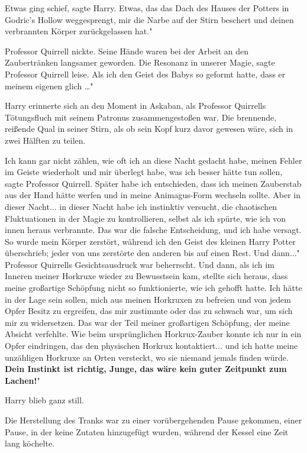 Etwas ging schief\grqq{}, sagte Harry. \glqq{}Etwas, das das Dach des Hauses der
Potters in Godric's Hollow weggesprengt, mir die Narbe auf der Stirn beschert
und deinen verbrannten Körper zurückgelassen hat."

Professor Quirrell nickte. Seine Hände waren bei der Arbeit an den Zaubertränken
langsamer geworden. \glqq{}Die Resonanz in unserer Magie\grqq{}, sagte Professor
Quirrell leise. \glqq{}Als ich den Geist des Babys so geformt hatte, dass er
meinem eigenen glich …"

Harry erinnerte sich an den Moment in Askaban, als Professor Quirrells
Tötungsfluch mit seinem Patronus zusammengestoßen war. Die brennende, reißende
Qual in seiner Stirn, als ob sein Kopf kurz davor gewesen wäre, sich in zwei
Hälften zu teilen.

\glqq{}Ich kann gar nicht zählen, wie oft ich an diese Nacht gedacht habe, meinen
Fehler im Geiste wiederholt und mir überlegt habe, was ich besser hätte tun
sollen\grqq{}, sagte Professor Quirrell. \glqq{}Später habe ich entschieden, dass
ich meinen Zauberstab aus der Hand hätte werfen und in meine Animagus-Form
wechseln sollte. Aber in dieser Nacht... in dieser Nacht habe ich instinktiv
versucht, die chaotischen Fluktuationen in der Magie zu kontrollieren, selbst
als ich spürte, wie ich von innen heraus verbrannte. Das war die falsche
Entscheidung, und ich habe versagt. So wurde mein Körper zerstört, während ich
den Geist des kleinen Harry Potter überschrieb; jeder von uns zerstörte den
anderen bis auf einen Rest. Und dann..." Professor Quirrells Gesichtsausdruck
war beherrscht. \glqq{}Und dann, als ich im Inneren meiner Horkruxe wieder zu
Bewusstsein kam, stellte sich heraus, dass meine großartige Schöpfung nicht so
funktionierte, wie ich gehofft hatte. Ich hätte in der Lage sein sollen, mich
aus meinen Horkruxen zu befreien und von jedem Opfer Besitz zu ergreifen, das
mir zustimmte oder das zu schwach war, um sich mir zu widersetzen. Das war der
Teil meiner großartigen Schöpfung, der meine Absicht verfehlte. Wie beim
ursprünglichen Horkrux-Zauber konnte ich nur in ein Opfer eindringen, das den
physischen Horkrux kontaktiert... und ich hatte meine unzähligen Horkruxe an
Orten versteckt, wo sie niemand jemals finden würde. \textbf{Dein Instinkt ist
richtig, Junge, das wäre kein guter Zeitpunkt zum Lachen!}"

Harry blieb ganz still.

Die Herstellung des Tranks war zu einer vorübergehenden Pause gekommen, einer
Pause, in der keine Zutaten hinzugefügt wurden, während der Kessel eine Zeit
lang köchelte.

